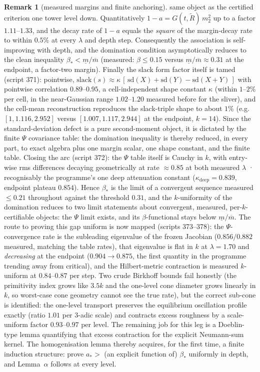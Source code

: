 \documentclass[11pt]{article}
\theoremstyle{definition}
\newtheorem{remark}[theorem]{Remark}
\newcommand{\lam}{\lambda}
\begin{document}
\begin{remark}[measured margins and finite anchoring]
same object as the certified criterion one tower level down. Quantitatively
$1 - a = G(t, \tilde R)\, m_2^2$ up to a factor $1.11$--$1.33$, and the decay
rate of $1-a$ equals the \emph{square} of the margin-decay rate to within
$0.5\%$ at every $\lam$ and depth step. Consequently the association is
self-improving with depth, and the domination condition asymptotically
reduces to the clean inequality $\beta_* < \underline m/\overline m$
(measured: $\beta \le 0.15$ versus $\underline m/\overline m \approx 0.31$ at
the endpoint, a factor-two margin). Finally the slack form factor itself is tamed (script 371): pointwise,
$\mathrm{slack}(s) \approx \kappa\,[\,\mathrm{sd}(X) + \mathrm{sd}(Y) -
\mathrm{sd}(X+Y)\,]$ with pointwise correlation $0.89$--$0.95$, a
cell-independent shape constant $\kappa$ (within $1$--$2\%$ per cell, in the
near-Gaussian range $1.02$--$1.20$ measured before for the sliver), and the
cell-mean reconstruction reproduces the slack-triple shape to about $1\%$
(e.g.\ $[1, 1.116, 2.952]$ versus $[1.007, 1.117, 2.944]$ at the endpoint,
$k=14$). Since the standard-deviation defect is a pure second-moment object,
it is dictated by the finite $\Psi$ covariance table: the domination
inequality is thereby reduced, in every part, to exact algebra plus one
margin scalar, one shape constant, and the finite table. Closing the arc (script 372): the $\Psi$ table itself is Cauchy in $k$,
with entry-wise rms differences decaying geometrically at rate $\approx 0.85$
at both measured $\lam$ · recognisably the programme's one deep attenuation
constant ($\kappa_{\mathrm{deep}} = 0.839$, endpoint plateau $0.854$). Hence
$\beta_*$ is the limit of a convergent sequence measured $\le 0.21$
throughout against the threshold $0.31$, and the $k$-uniformity of the
domination reduces to two limit statements about convergent, measured,
per-$k$-certifiable objects: the $\Psi$ limit exists, and its
$\beta$-functional stays below $\underline m/\overline m$. The route to proving this gap uniform is now mapped (scripts 373--378):
the $\Psi$-convergence rate is the subleading eigenvalue of the frozen
Jacobian ($0.856/0.882$ measured, matching the table rates), that eigenvalue
is flat in $k$ at $\lam = 1.70$ and \emph{decreasing} at the endpoint
($0.904 \to 0.875$, the first quantity in the programme trending away from
critical), and the Hilbert-metric contraction is measured $k$-uniform at
$0.84$--$0.87$ per step. Two crude Birkhoff bounds fail honestly (the
primitivity index grows like $3.5k$ and the one-level cone diameter grows
linearly in $k$, so worst-case cone geometry cannot see the true rate), but
the correct sub-cone is identified: the one-level transport preserves the
equilibrium oscillation profile exactly (ratio $1.01$ per 3-adic scale) and
contracts excess roughness by a scale-uniform factor $0.93$--$0.97$ per
level. The remaining job for this leg is a Doeblin-type lemma quantifying
that excess contraction for the explicit Neumann-sum kernel. The homogenisation 
lemma thereby acquires, for the first time, a finite induction structure:
prove $a_* >$ (an explicit function of) $\beta_*$ uniformly in depth, and
Lemma~$\alpha$ follows at every level.
\end{remark}
\end{document}
